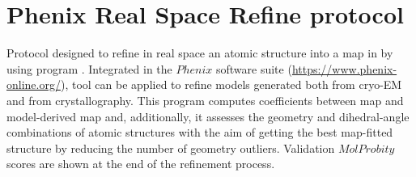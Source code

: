 \section{Phenix Real Space Refine protocol}
\label{app:realSpaceRefineProtocol}%
Protocol designed to refine in real space an atomic structure into a map in \scipion by using  program \citep{afonine2018}. Integrated in the $Phenix$ software suite (\url{https://www.phenix-online.org/}),  tool can be applied to refine models generated both from cryo-EM and from crystallography. This program computes  coefficients between map and model-derived map and, additionally, it assesses the geometry and dihedral-angle combinations of atomic structures with the aim of getting the best map-fitted structure by reducing the number of geometry outliers.   Validation $MolProbity$ scores are shown at the end of the refinement process.\\


